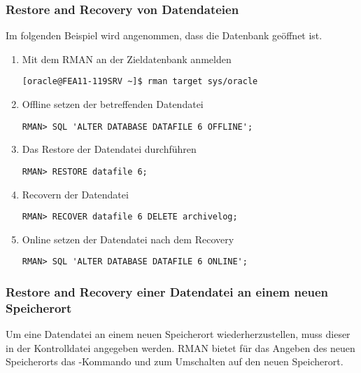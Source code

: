         \subsubsection{Restore and Recovery von Datendateien}
          Im folgenden Beispiel wird angenommen, dass die Datenbank geöffnet ist.
          \begin{enumerate}
            \item Mit dem RMAN an der Zieldatenbank anmelden
              \begin{lstlisting}[caption={An der Zieldatenbank anmelden},label=admin1474,language=rman]
[oracle@FEA11-119SRV ~]$ rman target sys/oracle
              \end{lstlisting}
            \item Offline setzen der betreffenden Datendatei
              \begin{lstlisting}[caption={Betreffende Datendatei Offline setzen},label=admin1475,language=rman,emph={[9]ALTER,DATABASE,DATAFILE,OFFLINE,IMMEDIATE},emphstyle={[9]\color{magenta}\bfseries}]
RMAN> SQL 'ALTER DATABASE DATAFILE 6 OFFLINE';
              \end{lstlisting}
            \item Das Restore der Datendatei durchführen
              \begin{lstlisting}[caption={Restore der betreffenden Datendatei},label=admin1476,language=rman]
RMAN> RESTORE datafile 6;
              \end{lstlisting}
            \item Recovern der Datendatei
              \begin{lstlisting}[caption={Recovery der Datendatei},label=admin1477,language=rman]
RMAN> RECOVER datafile 6 DELETE archivelog;
              \end{lstlisting}
            \item Online setzen der Datendatei nach dem Recovery
              \begin{lstlisting}[caption={Betreffende Datendatei Online setzen},label=admin1478,language=rman,emph={[9]ALTER,DATABASE,DATAFILE,ONLINE},emphstyle={[9]\color{magenta}\bfseries}]
RMAN> SQL 'ALTER DATABASE DATAFILE 6 ONLINE';
              \end{lstlisting}
          \end{enumerate}
        \subsubsection{Restore and Recovery einer Datendatei an einem neuen Speicherort}
          Um eine Datendatei an einem neuen Speicherort wiederherzustellen, muss dieser in der Kontrolldatei angegeben werden. RMAN bietet für das Angeben des neuen Speicherorts das -Kommando und  zum Umschalten auf den neuen Speicherort.

